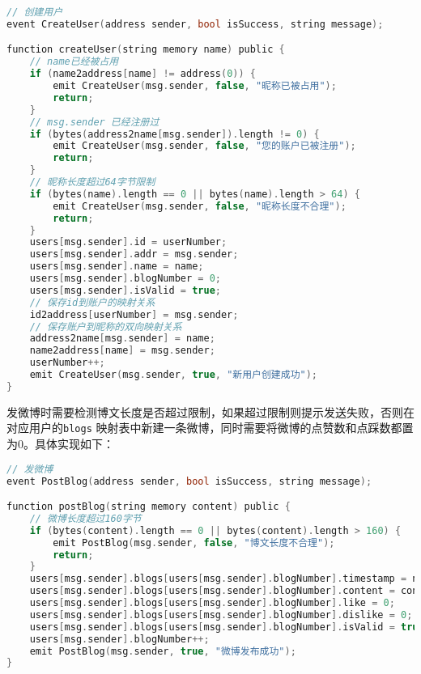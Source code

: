 \documentclass[bwprint]{hfutreport}
\begin{document}
\begin{lstlisting}[language=c]
// 创建用户
event CreateUser(address sender, bool isSuccess, string message);

function createUser(string memory name) public {
    // name已经被占用
    if (name2address[name] != address(0)) {
        emit CreateUser(msg.sender, false, "昵称已被占用");
        return;
    }
    // msg.sender 已经注册过
    if (bytes(address2name[msg.sender]).length != 0) {
        emit CreateUser(msg.sender, false, "您的账户已被注册");
        return;
    }
    // 昵称长度超过64字节限制
    if (bytes(name).length == 0 || bytes(name).length > 64) {
        emit CreateUser(msg.sender, false, "昵称长度不合理");
        return;
    }
    users[msg.sender].id = userNumber;
    users[msg.sender].addr = msg.sender;
    users[msg.sender].name = name;
    users[msg.sender].blogNumber = 0;
    users[msg.sender].isValid = true;
    // 保存id到账户的映射关系
    id2address[userNumber] = msg.sender;
    // 保存账户到昵称的双向映射关系
    address2name[msg.sender] = name;
    name2address[name] = msg.sender;
    userNumber++;
    emit CreateUser(msg.sender, true, "新用户创建成功");
}
\end{lstlisting}

发微博时需要检测博文长度是否超过限制，如果超过限制则提示发送失败，否则在对应用户的\verb|blogs|
映射表中新建一条微博，同时需要将微博的点赞数和点踩数都置为0。具体实现如下：
\begin{lstlisting}[language=c]
// 发微博
event PostBlog(address sender, bool isSuccess, string message);

function postBlog(string memory content) public {
    // 微博长度超过160字节
    if (bytes(content).length == 0 || bytes(content).length > 160) {
        emit PostBlog(msg.sender, false, "博文长度不合理");
        return;
    }
    users[msg.sender].blogs[users[msg.sender].blogNumber].timestamp = now;
    users[msg.sender].blogs[users[msg.sender].blogNumber].content = content;
    users[msg.sender].blogs[users[msg.sender].blogNumber].like = 0;
    users[msg.sender].blogs[users[msg.sender].blogNumber].dislike = 0;
    users[msg.sender].blogs[users[msg.sender].blogNumber].isValid = true;
    users[msg.sender].blogNumber++;
    emit PostBlog(msg.sender, true, "微博发布成功");
}
\end{lstlisting}
\end{document}
